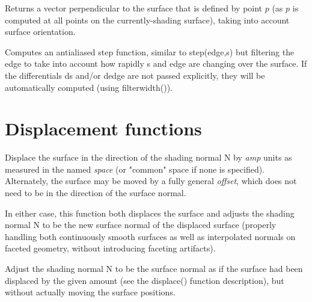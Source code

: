 \documentclass[11pt,letterpaper]{book}
\def\N{{\cf N}\xspace}
\def\commonspace{{\cf "common"} space\xspace}
\begin{document}
Returns a vector perpendicular to the surface that is defined by point
$p$ (as $p$ is computed at all points on the currently-shading surface),
taking into account surface orientation.
\apiend

Computes an antialiased step function, similar to {\cf step(edge,s)} but
filtering the edge to take into account how rapidly {\cf s} and {\cf edge}
are changing over the surface.  If the differentials {\cf ds} and/or
{\cf dedge} are not passed explicitly, they will be automatically 
computed (using {\cf filterwidth()}).
\apiend


\section{Displacement functions}
\label{sec:stdlib:displace}


Displace the surface in the direction of the shading normal \N by
\emph{amp} units as measured in the named \emph{space} (or \commonspace
if none is specified).  Alternately, the surface may be moved by a fully
general \emph{offset}, which does not need to be in the direction of the
surface normal.

In either case, this function both displaces the surface and adjusts the
shading normal \N to be the new surface normal of the displaced surface
(properly handling both continuously smooth surfaces as well as
interpolated normals on faceted geometry, without introducing faceting
artifacts).
\apiend


Adjust the shading normal \N to be the surface normal as if the
surface had been displaced by the given amount (see the {\cf displace()}
function description), but without actually moving the surface
positions.
\apiend
\end{document}
